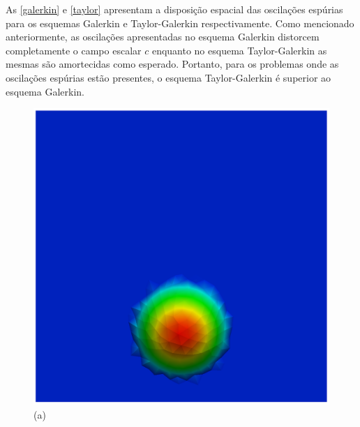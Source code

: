\vspace{-1cm}
As \ref{galerkin} e \ref{taylor} apresentam a disposição espacial das oscilações espúrias
para os esquemas Galerkin e Taylor-Galerkin respectivamente. Como mencionado anteriormente,
as oscilações apresentadas no esquema Galerkin distorcem completamente o campo escalar $c$
enquanto no esquema Taylor-Galerkin as mesmas são amortecidas como esperado. Portanto,
para os problemas onde as oscilações espúrias estão presentes,
o esquema Taylor-Galerkin é superior ao esquema Galerkin.

\vspace{0.5cm}
\begin{figure}[H]
     \centering
     \begin{minipage}{.5\linewidth}
      \centering
      \includegraphics[scale=0.2]{./02_chaps/cap_validation/figure/galerkin_0.png}\\
      (a)
     \end{minipage}%
     \begin{minipage}{.5\linewidth}
      \centering

\end{minipage}
\end{figure}
